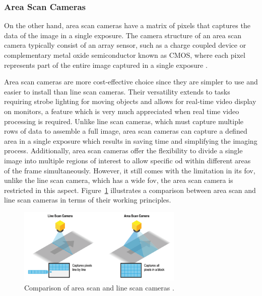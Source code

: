 \subsubsection{Area Scan Cameras}
On the other hand, area scan cameras have a matrix of pixels that captures the data of the image in a single exposure. The camera structure of an area scan camera typically consist of an array sensor, such as a charge coupled device or complementary metal oxide semiconductor known as CMOS, where each pixel represents part of the entire image captured in a single exposure \cite{AS_VS_LS_ART}. 

Area scan cameras are more cost-effective choice since they are simpler to use and easier to install than line scan cameras. Their versatility extends to tasks requiring strobe lighting for moving objects and allows for real-time video display on monitors, a feature which is very much appreciated when real time video processing is required. Unlike line scan cameras, which must capture multiple rows of data to assemble a full image, area scan cameras can capture a defined area in a single exposure which results in saving time and simplifying the imaging process. Additionally, area scan cameras offer the flexibility to divide a single image into multiple regions of interest to allow specific \gls{od} within different areas of the frame simultaneously. However, it still comes with the limitation in its \gls{fov}, unlike the line scan camera, which has a wide \gls{fov}, the area scan camera is restricted in this aspect. Figure~\ref{AS_VS_LS_PIC} illustrates a comparison between area scan and line scan cameras in terms of their working principles.

\begin{figure}[h]
    \centering
    \includegraphics[width=0.7\textwidth]{Figures/Line-Scan-v-Area-Scan.png}  
    \caption{Comparison of area scan and line scan cameras \cite{AS_VS_LS_PIC}.}
    \label{AS_VS_LS_PIC}
\end{figure}


